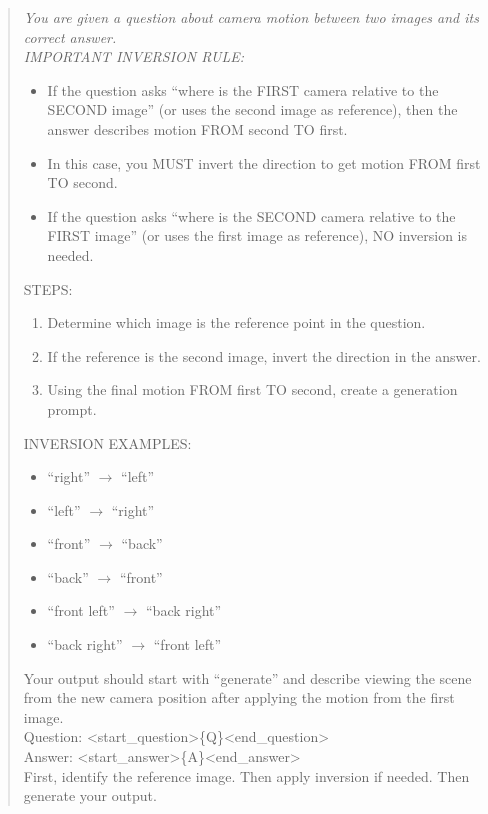 \begin{quote}
\itshape
You are given a question about camera motion between two images and its correct answer.\\[4pt]
IMPORTANT INVERSION RULE:
\begin{itemize}
    \item If the question asks ``where is the FIRST camera relative to the SECOND image'' (or uses the second image as reference), then the answer describes motion FROM second TO first.
    \item In this case, you MUST invert the direction to get motion FROM first TO second.
    \item If the question asks ``where is the SECOND camera relative to the FIRST image'' (or uses the first image as reference), NO inversion is needed.
\end{itemize}
STEPS:
\begin{enumerate}
    \item Determine which image is the reference point in the question.
    \item If the reference is the second image, invert the direction in the answer.
    \item Using the final motion FROM first TO second, create a generation prompt.
\end{enumerate}
INVERSION EXAMPLES:
\begin{itemize}
    \item ``right'' $\to$ ``left''
    \item ``left'' $\to$ ``right''
    \item ``front'' $\to$ ``back''
    \item ``back'' $\to$ ``front''
    \item ``front left'' $\to$ ``back right''
    \item ``back right'' $\to$ ``front left''
\end{itemize}
Your output should start with ``generate'' and describe viewing the scene from the new camera position after applying the motion from the first image.\\[4pt]
Question: \textless start\_question\textgreater\{Q\}\textless end\_question\textgreater\\
Answer: \textless start\_answer\textgreater\{A\}\textless end\_answer\textgreater\\[4pt]
First, identify the reference image. Then apply inversion if needed. Then generate your output.
\end{quote}
 
